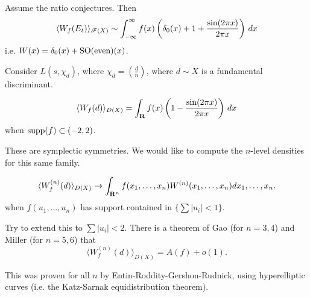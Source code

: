 \begin{theorem}
Assume the ratio conjectures. Then 
\[
  \langle W_f(E_t)\rangle_{\mathscr{F}(X)} \sim \int_{-\infty}^\infty f(x) \left(\delta_0(x)+1+\frac{\sin(2\pi x)}{2\pi x}\right)\, dx 
\]
i.e. $W(x)=\delta_0(x)+\operatorname{SO}(\text{even})(x)$. 
\end{theorem}

\begin{example}
Consider $L(s,\chi_d)$, where $\chi_d=\left(\frac d n\right)$, where 
$d\sim X$ is a fundamental discriminant. 
\end{example}

\begin{theorem}
\[
  \langle W_f(d)\rangle_{D(X)} = \int_{\mathbf{R}} f(x)\left(1-\frac{\sin(2\pi x)}{2\pi x}\right)\, dx 
\]
when $\operatorname{supp}(f)\subset (-2,2)$. 
\end{theorem}

These are symplectic symmetries. We would like to compute the $n$-level 
densities for this same family. 

\begin{theorem}[Rubenstein]
\[
  \langle W_f^{(n)}(d)\rangle_{D(X)} \to \int_{\mathbf{R}^n} f(x_1,\dots,x_n)  W^{(n)}(x_1,\dots,x_n) dx_1,\dots,x_n .
\]
when $\hat f(u_1,\dots,u_n)$ has support contained in 
$\{\sum |u_i|<1\}$. 
\end{theorem}

Try to extend this to $\sum |u_i|<2$. There is a theorem of Gao (for $n=3,4$) 
and Miller (for $n=5,6$) that 
\[
  \langle W_f^{(n)}(d)\rangle_{D(X)} = A(f) + o(1) .
\]

\begin{theorem}
This was proven for all $n$ by Entin-Roddity-Gershon-Rudnick, using 
hyperelliptic curves (i.e. the Katz-Sarnak equidistribution theorem). 
\end{theorem}




